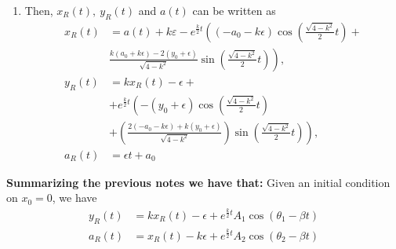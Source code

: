 \documentclass[a4paper,preprint,11pt]{article}
\begin{document}
\begin{enumerate}
\begin{align*}
    \right),
\end{align*}
\item Then, $x_R(t),\ y_R(t)$ and $a(t)$ can be written as
\begin{align*}
x_R(t)&=a(t)+k\varepsilon-
  e^{\frac {k}{2}t} \left(
      (-a_0-k\epsilon) \cos\left(\frac {\sqrt{4-k^2}}2t \right)+\right. \\
      & \left. \frac{k(a_0+k\epsilon)-2(y_0+\epsilon)}{\sqrt{4-k^2}} \sin\left(\frac {\sqrt{4-k^2}}2t \right)
    \right),\\
y_R(t)&=k x_R(t) - \epsilon +\\
  &+e^{\frac {k}{2}t} \left(
      -(y_0+\epsilon)\cos\left(\frac {\sqrt{4-k^2}}2t \right) \right. \\
      &  \left. +\left( \frac{2(-a_0-k\epsilon) +k(y_0+\epsilon)}{\sqrt{4-k^2}} \right) \sin\left(\frac {\sqrt{4-k^2}}2t \right)
    \right),\\
a_R(t)&=\epsilon t + a_0
\end{align*}
\end{enumerate}

\textbf{Summarizing the previous notes we have that:} Given an initial condition on $x_0=0$, we have
\begin{align*}
    y_R(t)&=kx_R(t)-\epsilon+e^{\frac k 2 t} A_1\cos(\theta_1-\beta t)\\
    a_R(t) &=x_R(t)-k\epsilon+e^{\frac k 2 t} A_2\cos(\theta_2-\beta t)
\end{align*}
\end{document}
